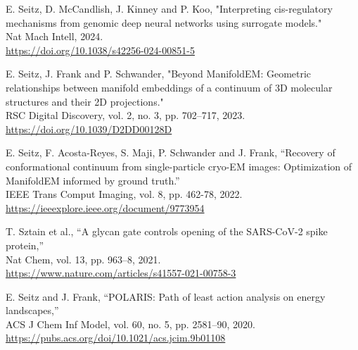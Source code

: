 \documentclass[10pt]{article}
\newcommand{\blankline}{\quad\pagebreak[3]}
\begin{document}
		\begin{bibenum}
			\item E. Seitz, D. McCandlish, J. Kinney and P. Koo, "Interpreting cis-regulatory mechanisms from genomic deep neural networks using surrogate models."\\Nat Mach Intell, 2024.\\\href{https://doi.org/10.1038/s42256-024-00851-5} {https://doi.org/10.1038/s42256-024-00851-5}
		
			\item E. Seitz, J. Frank and P. Schwander, "Beyond ManifoldEM: Geometric relationships between manifold embeddings of a continuum of 3D molecular structures and their 2D projections."\\RSC Digital Discovery, vol. 2, no. 3, pp. 702–717, 2023.\\\href{https://doi.org/10.1039/D2DD00128D} {https://doi.org/10.1039/D2DD00128D}
		
			\item E. Seitz, F. Acosta-Reyes, S. Maji, P. Schwander and J. Frank, “Recovery of conformational continuum from single-particle cryo-EM images: Optimization of ManifoldEM informed by ground truth.”\\IEEE Trans Comput Imaging, vol. 8, pp. 462-78, 2022.\\\href{https://ieeexplore.ieee.org/document/9773954} {https://ieeexplore.ieee.org/document/9773954}
			
			\item T. Sztain et al., “A glycan gate controls opening of the SARS-CoV-2 spike protein,”\\Nat Chem, vol. 13, pp. 963–8, 2021.\\\href{https://www.nature.com/articles/s41557-021-00758-3} {https://www.nature.com/articles/s41557-021-00758-3}
		
			\item E. Seitz and J. Frank, “POLARIS: Path of least action analysis on energy landscapes,”\\ACS J Chem Inf Model, vol. 60, no. 5, pp. 2581–90, 2020.\\\href{https://pubs.acs.org/doi/10.1021/acs.jcim.9b01108} {https://pubs.acs.org/doi/10.1021/acs.jcim.9b01108}
	
		\end{bibenum}
	
	\blankline
		
\end{document}
